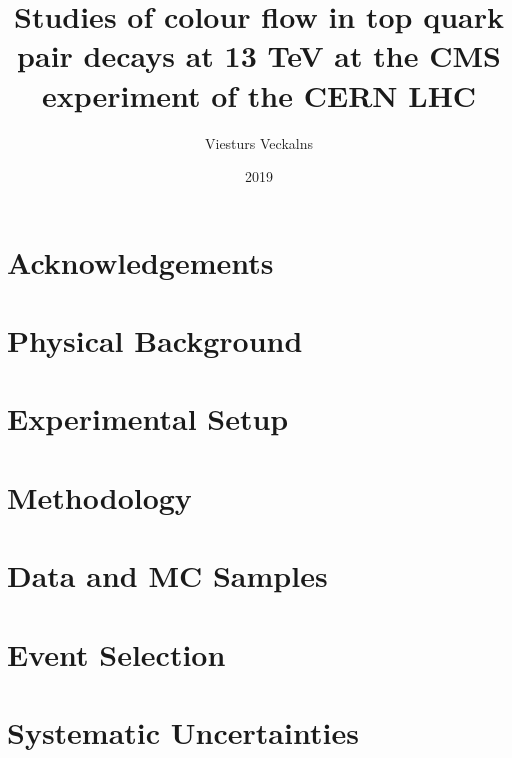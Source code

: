 \documentclass[titlepage, a4paper, EN]{mythesis}
\title{Studies of colour flow in top quark pair decays at 13 TeV at the CMS experiment of the CERN LHC}
\author{Viesturs Veckalns}
\date{2019}
\begin{document}
\maketitle
\begin{abstract}
        
\end{abstract}
\chapter*{Acknowledgements}
\label{chap:acknowledgements}


\tableofcontents
{}
\label{chap:introduction}


\chapter{Physical Background}


\chapter{Experimental Setup}
\label{sec:experimental_setup}


\chapter{Methodology}
\label{chap:methodology}


\chapter{Data and MC Samples}


\chapter{Event Selection}
\label{chap:event_selection}


\chapter{Systematic Uncertainties}
\label{chap:systematic_uncertainties}

\end{document}
